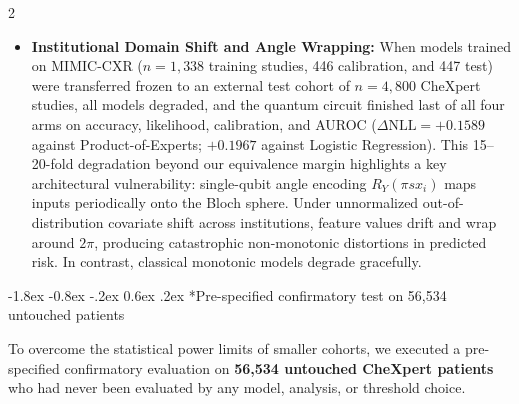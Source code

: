 \documentclass[10pt,a4paper,twoside]{article}
\makeatletter
\renewcommand{\subsection}{\@startsection{subsection}{2}{\z@}%
  {-1.8ex \@plus -0.8ex \@minus -.2ex}%
  {0.6ex \@plus.2ex}%
  {\normalfont\normalsize\sffamily\bfseries\color{naturedark}}}
\makeatother
\begin{document}
\begin{multicols}{2}
\begin{itemize}
  \item \textbf{Institutional Domain Shift and Angle Wrapping:} When models trained on MIMIC-CXR ($n = 1,338$ training studies, 446 calibration, and 447 test) were transferred frozen to an external test cohort of $n = 4,800$ CheXpert studies, all models degraded, and the quantum circuit finished last of all four arms on accuracy, likelihood, calibration, and AUROC ($\Delta\text{NLL} = +0.1589$ against Product-of-Experts; $+0.1967$ against Logistic Regression). This 15--20-fold degradation beyond our equivalence margin highlights a key architectural vulnerability: single-qubit angle encoding $R_Y(\pi s x_i)$ maps inputs periodically onto the Bloch sphere. Under unnormalized out-of-distribution covariate shift across institutions, feature values drift and wrap around $2\pi$, producing catastrophic non-monotonic distortions in predicted risk. In contrast, classical monotonic models degrade gracefully.
\end{itemize}

\subsection*{Pre-specified confirmatory test on 56,534 untouched patients}

To overcome the statistical power limits of smaller cohorts, we executed a pre-specified confirmatory evaluation on \textbf{56,534 untouched CheXpert patients} who had never been evaluated by any model, analysis, or threshold choice.


\end{multicols}
\end{document}
